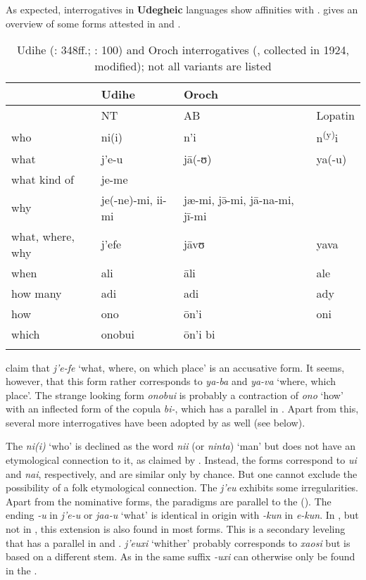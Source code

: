 As expected, interrogatives in \textbf{Udegheic} languages show affinities with .  gives an overview of some forms attested in  and .

\begin{table}
\caption{Udihe (\citealt{NikolaevaTolskaya2001}: 348ff.; \citealt{TolskayaTolskaya2008}: 100) and Oroch interrogatives (\citealt{AvrorinBoldyrev1978,Lopatin1957}, collected in 1924, modified); not all variants are listed}
\label{tab:tungu:23}

\begin{tabularx}{\textwidth}{XXll}
\lsptoprule
& \textbf{Udihe} & \textbf{Oroch} & \\
\midrule
& NT  & AB & Lopatin\\
\midrule
who & ni(i) & n’i & n\textsuperscript{(y)}i\\
what & j’e-u & jā(-ʊ) & ya(-u)\\
what kind of & je-me & &\\
why & je(-ne)-mi, ii-mi & jæ-mi, jə̄-mi, jā-na-mi, jī-mi & \\
what, where, why & j’efe & jāvʊ & yava\\
when & ali & āli & ale\\
how many & adi & adi & ady\\
how & ono & ōn’i & oni\\
which & onobui & ōn’i bi & \\
\lspbottomrule
\end{tabularx}
\end{table}

\citet[348]{NikolaevaTolskaya2001} claim that \textit{j’e-fe} ‘what, where, on which place’ is an accusative form. It seems, however, that this form rather corresponds to  \textit{ya-ba} and  \textit{ya-va} ‘where, which place’. The strange looking form \textit{onobui} is probably a contraction of \textit{ono} ‘how’ with an inflected form of the copula \textit{bi-}, which has a parallel in . Apart from this, several more  interrogatives have been adopted by  as well (see below).

The  \textit{ni(i)} ‘who’ is declined as the word \textit{nii} (or \textit{ninta}) ‘man’ but does not have an etymological connection to it, as claimed by \citet{Schulze2007}. Instead, the forms correspond to  \textit{ui} and \textit{nai}, respectively, and are similar only by chance. But one cannot exclude the possibility of a folk etymological connection. The  \textit{j’eu} exhibits some irregularities. Apart from the nominative forms, the paradigms are parallel to the  (). The ending \textit{-u} in \textit{j’e-u} or \textit{jaa-u} ‘what’ is identical in origin with  \textit{-kun} in \textit{e-kun}. In , but not in , this extension is also found in most  forms. This is a secondary leveling that has a parallel in  and .  \textit{j’euxi} ‘whither’ probably corresponds to  \textit{xaosi} but is based on a different stem. As in  the same suffix \textit{-uxi} can otherwise only be found in the .


